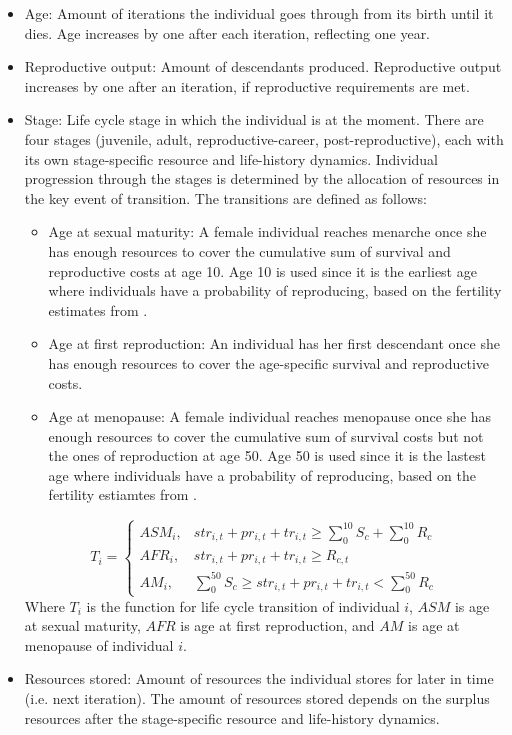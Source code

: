 \documentclass{article}
\begin{document}
    \begin{itemize}
        \item Age: Amount of iterations the individual goes through from its birth until it dies. Age increases by one after each iteration, reflecting one year.
        \item Reproductive output: Amount of descendants produced. Reproductive output increases by one after an iteration, if reproductive requirements are met.
        \item Stage: Life cycle stage in which the individual is at the moment. There are four stages (juvenile, adult, reproductive-career, post-reproductive), each with its own stage-specific resource and life-history dynamics. Individual progression through the stages is determined by the allocation of resources in the key event of transition. The transitions are defined as follows:
        \begin{itemize}
            \item Age at sexual maturity: A female individual reaches menarche once she has enough resources to cover the cumulative sum of survival and reproductive costs at age 10. Age 10 is used since it is the earliest age where individuals have a probability of reproducing, based on the fertility estimates from \cite{davison2021human}.
            \item Age at first reproduction: An individual has her first descendant once she has enough resources to cover the age-specific survival and reproductive costs.
            \item Age at menopause: A female individual reaches menopause once she has enough resources to cover the cumulative sum of survival costs but not the ones of reproduction at age 50. Age 50 is used since it is the lastest age where individuals have a probability of reproducing, based on the fertility estiamtes from \cite{davison2021human}. 
        \end{itemize}
\begin{equation}
    T_i=\begin{cases}
    ASM_i,& str_{i,t}+pr_{i,t}+tr_{i,t} \geq \sum_0^{10}S_c+\sum_0^{10}R_c\\
    AFR_i,& str_{i,t}+pr_{i,t}+tr_{i,t} \geq R_{c,t}\\
    AM_i,& \sum_0^{50}S_c \geq str_{i,t}+pr_{i,t}+tr_{i,t} < \sum_0^{50}R_c
\end{cases}
\end{equation}
        Where $T_i$ is the function for life cycle transition of individual $i$, $ASM$ is age at sexual maturity, $AFR$ is age at first reproduction, and $AM$ is age at menopause of individual $i$.
        \item Resources stored: Amount of resources the individual stores for later in time (i.e. next iteration). The amount of resources stored depends on the surplus resources after the stage-specific resource and life-history dynamics. 
    \end{itemize}
\end{document}

